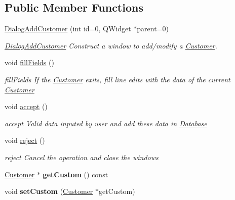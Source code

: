 \subsection*{Public Member Functions}
\begin{DoxyCompactItemize}
\item 
\hyperlink{classDialogAddCustomer_a6123adb32813c5ebe71ce06012c46b9c}{Dialog\+Add\+Customer} (int id=0, Q\+Widget $\ast$parent=0)
\begin{DoxyCompactList}\small\item\em \hyperlink{classDialogAddCustomer}{Dialog\+Add\+Customer} Construct a window to add/modify a \hyperlink{classCustomer}{Customer}. \end{DoxyCompactList}\item 
\hypertarget{classDialogAddCustomer_ae06c708abccad5ce0b8523c94b40eb75}{void \hyperlink{classDialogAddCustomer_ae06c708abccad5ce0b8523c94b40eb75}{fill\+Fields} ()}\label{classDialogAddCustomer_ae06c708abccad5ce0b8523c94b40eb75}

\begin{DoxyCompactList}\small\item\em fill\+Fields If the \hyperlink{classCustomer}{Customer} exits, fill line edits with the data of the current \hyperlink{classCustomer}{Customer} \end{DoxyCompactList}\item 
\hypertarget{classDialogAddCustomer_a1492352d114740bb44178f2415555155}{void \hyperlink{classDialogAddCustomer_a1492352d114740bb44178f2415555155}{accept} ()}\label{classDialogAddCustomer_a1492352d114740bb44178f2415555155}

\begin{DoxyCompactList}\small\item\em accept Valid data inputed by user and add these data in \hyperlink{classDatabase}{Database} \end{DoxyCompactList}\item 
\hypertarget{classDialogAddCustomer_a6affc8db156ee183ffd14a71d06a8534}{void \hyperlink{classDialogAddCustomer_a6affc8db156ee183ffd14a71d06a8534}{reject} ()}\label{classDialogAddCustomer_a6affc8db156ee183ffd14a71d06a8534}

\begin{DoxyCompactList}\small\item\em reject Cancel the operation and close the windows \end{DoxyCompactList}\item 
\hypertarget{classDialogAddCustomer_a65516413d3d3cb78acb03f5b45bc0278}{\hyperlink{classCustomer}{Customer} $\ast$ {\bfseries get\+Custom} () const }\label{classDialogAddCustomer_a65516413d3d3cb78acb03f5b45bc0278}

\item 
\hypertarget{classDialogAddCustomer_afde6fa7e1b2758d56f400fd719dfb603}{void {\bfseries set\+Custom} (\hyperlink{classCustomer}{Customer} $\ast$get\+Custom)}\label{classDialogAddCustomer_afde6fa7e1b2758d56f400fd719dfb603}

\end{DoxyCompactItemize}


